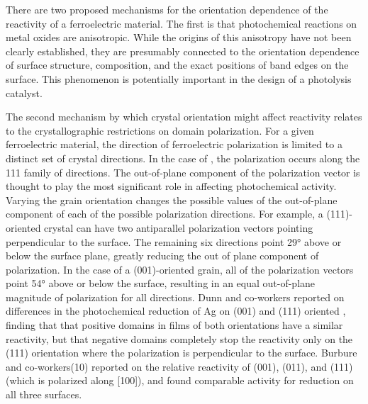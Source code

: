 There are two proposed mechanisms for the orientation dependence of the reactivity of a
ferroelectric material. The first is that photochemical reactions on metal oxides are
anisotropic.\cite{Giocondi:2003wc,Lowekamp:1998ks,MorrisHotsenpiller:1998jq,Ohno:2002fn,
Taguchi:2003hs} While the origins of this anisotropy have not been clearly established,
they are presumably connected to the orientation dependence of surface structure,
composition, and the exact positions of band edges on the surface.
\cite{Giocondi:2003wc,Giocondi:2007fa} This phenomenon is potentially important in the
design of a photolysis catalyst.\cite{Sosnowchik:2010jr}

The second mechanism by which crystal orientation might affect reactivity relates to the
crystallographic restrictions on domain polarization. For a given ferroelectric material,
the direction of ferroelectric polarization is limited to a distinct set of crystal
directions. In the case of , the polarization occurs along the 111 family of
directions.\cite{Anonymous:2011wx} The out-of-plane component of the polarization vector
is thought to play the most significant role in affecting photochemical activity. Varying
the grain orientation changes the possible values of the out-of-plane component of each of
the possible polarization directions. For example, a (111)-oriented crystal can have two
antiparallel polarization vectors pointing perpendicular to the surface. The remaining six
directions point 29\si{\degree} above or below the surface plane, greatly reducing the out
of plane component of polarization. In the case of a (001)-oriented grain, all of the
polarization vectors point 54\si{\degree} above or below the surface, resulting in an
equal out-of-plane magnitude of polarization for all directions. Dunn and
co-workers\cite{Dunn:2007cx} reported on differences in the photochemical reduction of Ag
on (001) and (111) oriented , finding that that positive domains in films of
both orientations have a similar reactivity, but that negative domains completely stop the
reactivity only on the (111) orientation where the polarization is perpendicular to the
surface. Burbure and co-workers(10) reported on the relative reactivity of (001), (011),
and (111)  (which is polarized along [100]), and found comparable activity for
reduction on all three surfaces.

